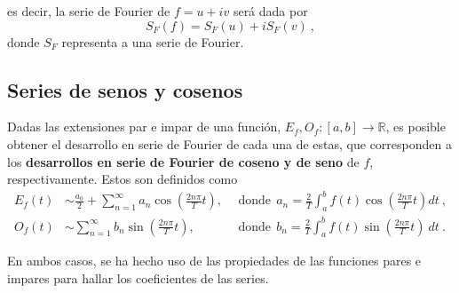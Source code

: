 es decir, la serie de Fourier de $f = u + iv$ será dada por
\begin{equation}
    S_F(f) = S_F(u) + i S_F(v) \ ,
\end{equation}
donde $S_F$ representa a una serie de Fourier.


\subsection{Series de senos y cosenos}

\begin{defi} 
    Dadas las extensiones par e impar de una función, $E_f, O_f: [a,b] \to \mathbb{R}$, es posible obtener el desarrollo en serie de Fourier de cada una de estas, que corresponden a los \textbf{desarrollos en serie de Fourier de coseno y de seno} de $f$, respectivamente. Estos son definidos como
    \begin{align*}
        E_f(t) & \sim \frac{a_0}{2}  + \sum_{n=1}^{\infty} a_n \cos\left( \frac{2n\pi}{T}t \right), & ~~\mbox{donde}~~ a_n = \frac{2}{T} \int_a^{b} f(t) \cos\left( \frac{2n\pi}{T}t \right)  dt \ , \\
        O_f(t) & \sim  \sum_{n=1}^{\infty} b_n \sin\left( \frac{2n\pi}{T}t \right), & ~~\mbox{donde} ~~ b_n = \frac{2}{T} \int_a^{b} f(t) \sin\left( \frac{2n\pi}{T}t \right) \ dt \ .
    \end{align*}

    En ambos casos, se ha hecho uso de las propiedades de las funciones pares e impares para hallar los coeficientes de las series.
\end{defi}






